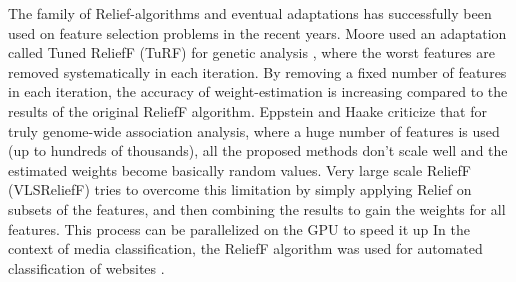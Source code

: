 The family of Relief-algorithms and eventual adaptations has successfully been used on feature selection problems in the recent years. Moore used an adaptation called Tuned ReliefF (TuRF) for genetic analysis \cite{Moore:07}, where the worst features are removed systematically in each iteration. By removing a fixed number of features in each iteration, the accuracy of weight-estimation is increasing compared to the results of the original ReliefF algorithm. Eppstein and Haake \cite{Eppstein:08} criticize that for truly genome-wide association analysis, where a huge number of features is used (up to hundreds of thousands), all the proposed methods don't scale well and the estimated weights become basically random values. Very large scale ReliefF (VLSReliefF) tries to overcome this limitation by simply applying Relief on subsets of the features, and then combining the results to gain the weights for all features. This process can be parallelized on the GPU to speed it up \cite{Lee:15}
In the context of media classification, the ReliefF algorithm was used for automated classification of websites \cite{Jin:07}.

